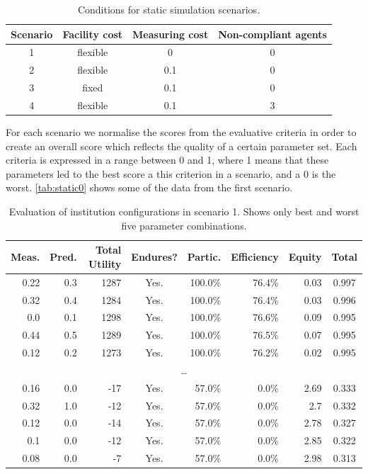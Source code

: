 \begin{table}
\centering
\caption{Conditions for static simulation scenarios.}\label{tab:scenarios}
\begin{tabular}{c||c|c|c}
Scenario & Facility cost & Measuring cost & Non-compliant agents \\
\hline
1 & flexible & 0 & 0 \\
2 & flexible & 0.1 & 0 \\
3 & fixed & 0.1 & 0 \\
4 & flexible & 0.1 & 3 \\
\end{tabular}
\end{table}

For each scenario we normalise the scores from the evaluative criteria
in order to create an overall score which reflects the quality of a certain
parameter set. Each criteria is expressed in a range between 0 and 1, where 1
means that these parameters led to the best score a this criterion in a
scenario, and a 0 is the worst. \autoref{tab:static0} shows some of the data
from the first scenario.

\begin{table}
\centering
\caption{Evaluation of institution configurations in scenario 1. Shows only best and worst five parameter combinations.}\label{tab:static0}
\begin{tabular}{r|r||r|c|r|r|r||c}
Meas. & Pred. & Total Utility & Endures? & Partic. & Efficiency & Equity & Total \\
\hline
0.22 & 0.3 & 1287 & Yes. & 100.0\% & 76.4\% & 0.03 & 0.997 \\
0.32 & 0.4 & 1284 & Yes. & 100.0\% & 76.4\% & 0.03 & 0.996 \\
0.0 & 0.1 & 1298 & Yes. & 100.0\% & 76.6\% & 0.09 & 0.995 \\
0.44 & 0.5 & 1289 & Yes. & 100.0\% & 76.5\% & 0.07 & 0.995 \\
0.12 & 0.2 & 1273 & Yes. & 100.0\% & 76.2\% & 0.02 & 0.995 \\
\multicolumn{8}{c}{\ldots} \\
0.16 & 0.0 & -17 & Yes. & 57.0\% & 0.0\% & 2.69 & 0.333 \\
0.32 & 1.0 & -12 & Yes. & 57.0\% & 0.0\% & 2.7 & 0.332 \\
0.12 & 0.0 & -14 & Yes. & 57.0\% & 0.0\% & 2.78 & 0.327 \\
0.1 & 0.0 & -12 & Yes. & 57.0\% & 0.0\% & 2.85 & 0.322 \\
0.08 & 0.0 & -7 & Yes. & 57.0\% & 0.0\% & 2.98 & 0.313 \\
\end{tabular}
\end{table}

